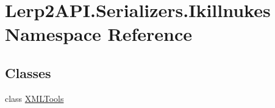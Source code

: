 \hypertarget{namespace_lerp2_a_p_i_1_1_serializers_1_1_ikillnukes}{}\section{Lerp2\+A\+P\+I.\+Serializers.\+Ikillnukes Namespace Reference}
\label{namespace_lerp2_a_p_i_1_1_serializers_1_1_ikillnukes}
\subsection*{Classes}
\begin{DoxyCompactItemize}
\item 
class \hyperlink{class_lerp2_a_p_i_1_1_serializers_1_1_ikillnukes_1_1_x_m_l_tools}{X\+M\+L\+Tools}
\end{DoxyCompactItemize}
